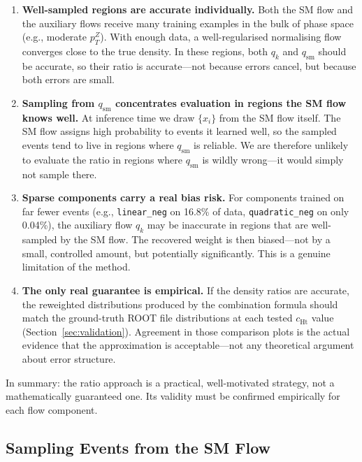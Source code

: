 \documentclass[11pt,a4paper]{article}
\begin{document}
\begin{enumerate}
  \item \textbf{Well-sampled regions are accurate individually.}  Both the SM flow and the auxiliary 
        flows receive many training examples in the bulk of phase space (e.g., moderate $p_T^Z$).  
        With enough data, a well-regularised normalising flow converges close to the true density.  
        In these regions, both $q_k$ and $q_{\text{sm}}$ should be accurate, so their ratio is 
        accurate---not because errors cancel, but because both errors are small.

  \item \textbf{Sampling from $q_{\text{sm}}$ concentrates evaluation in regions the SM flow knows 
        well.}  At inference time we draw $\{x_i\}$ from the SM flow itself.  The SM flow assigns 
        high probability to events it learned well, so the sampled events tend to live in regions 
        where $q_{\text{sm}}$ is reliable.  We are therefore unlikely to evaluate the ratio in 
        regions where $q_{\text{sm}}$ is wildly wrong---it would simply not sample there.

  \item \textbf{Sparse components carry a real bias risk.}  For components trained on far fewer events 
        (e.g., \texttt{linear\_neg} on 16.8\% of data, \texttt{quadratic\_neg} on only 0.04\%), the 
        auxiliary flow $q_k$ may be inaccurate in regions that are well-sampled by the SM flow.  
        The recovered weight is then biased---not by a small, controlled amount, but potentially 
        significantly.  This is a genuine limitation of the method.

  \item \textbf{The only real guarantee is empirical.}  If the density ratios are accurate, the 
        reweighted distributions produced by the combination formula should match the ground-truth 
        ROOT file distributions at each tested $c_{\text{Ht}}$ value (Section~\ref{sec:validation}).  
        Agreement in those comparison plots is the actual evidence that the approximation is 
        acceptable---not any theoretical argument about error structure.
\end{enumerate}

In summary: the ratio approach is a practical, well-motivated strategy, not a mathematically 
guaranteed one.  Its validity must be confirmed empirically for each flow component.

\subsection{Sampling Events from the SM Flow}
\end{document}
